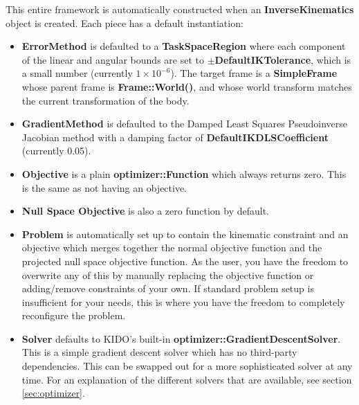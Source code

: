 This entire framework is automatically constructed when an \textbf{InverseKinematics} object is created. Each piece has a default instantiation:

\begin{itemize}
  \item \textbf{ErrorMethod} is defaulted to a \textbf{TaskSpaceRegion} where each component of the linear and angular bounds are set to $\pm$\textbf{DefaultIKTolerance}, which is a small number (currently $1\times 10^{-6}$). The target frame is a \textbf{SimpleFrame} whose parent frame is \textbf{Frame::World()}, and whose world transform matches the current transformation of the body.
  \item \textbf{GradientMethod} is defaulted to the Damped Least Squares Pseudoinverse Jacobian method with a damping factor of \textbf{DefaultIKDLSCoefficient} (currently 0.05).
  \item \textbf{Objective} is a plain \textbf{optimizer::Function} which always returns zero. This is the same as not having an objective.
  \item \textbf{Null Space Objective} is also a zero function by default.
  \item \textbf{Problem} is automatically set up to contain the kinematic constraint and an objective which merges together the normal objective function and the projected null space objective function. As the user, you have the freedom to overwrite any of this by manually replacing the objective function or adding/remove constraints of your own. If standard problem setup is insufficient for your needs, this is where you have the freedom to completely reconfigure the problem.
  \item \textbf{Solver} defaults to KIDO's built-in \textbf{optimizer::GradientDescentSolver}. This is a simple gradient descent solver which has no third-party dependencies. This can be swapped out for a more sophisticated solver at any time. For an explanation of the different solvers that are available, see section \ref{sec:optimizer}.
\end{itemize}


